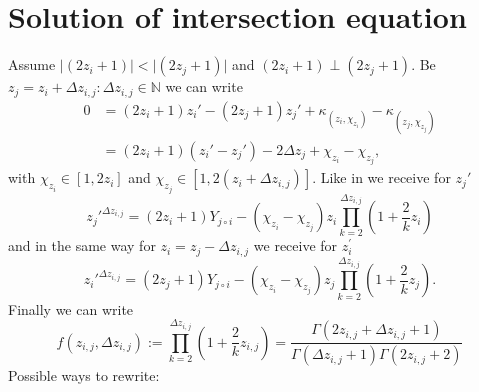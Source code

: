 \section{Solution of intersection equation}
\label{s:solutionofintersection}
Assume $\vert\left(2z_{i} + 1\right)\vert < \vert\left(2z_{j} + 1\right)\vert$ and $\left(2z_{i} + 1\right) \perp \left(2z_{j} + 1\right)$. Be $z_{j} = z_{i} + \Delta z_{i,j}:\Delta z_{i,j} \in \mathbb{N}$ we can write
\begin{equation}\begin{split}
	0 & = \left(2z_{i} + 1\right)z_{i}\prime - \left(2z_{j} + 1\right)z_{j}\prime + \kappa_{\left(z_{i}, \chi_{z_{i}}\right)} - \kappa_{\left(z_{j}, \chi_{z_{j}}\right)} \\
	& = \left(2z_{i} + 1\right)\left(z_{i}\prime - z_{j}\prime\right) - 2\Delta z_{j} + \chi_{z_{i}} - \chi_{z_{j}},
\end{split}\label{eq:intersectionDeltaz}\end{equation}
with $\chi_{z_{i}} \in [ 1, 2z_{i}]$ and $\chi_{z_{j}} \in [1, 2\left(z_{i} + \Delta z_{i,j}\right)]$. Like in \cite{2014arXiv1411.2824Z} we receive for $z_{j}\prime$
\begin{equation}
	z_{j}\prime^{\Delta z_{i,j}} = \left(2z_{i} + 1\right)Y_{j \circ i} - \left(\chi_{z_{i}} - \chi_{z_{j}}\right)z_{i}\prod_{k=2}^{\Delta z_{i,j}} \left(1 + \frac{2}{k}z_{i}\right)
\label{eq:zjsolution}\end{equation}
and in the same way for $z_{i} = z_{j} - \Delta z_{i,j}$ we receive for $z_{i}^{\prime}$
\begin{equation}
	z_{i}\prime^{\Delta z_{i,j}} = \left(2z_{j} + 1\right)Y_{j \circ i} - \left(\chi_{z_{i}} - \chi_{z_{j}}\right)z_{j}\prod_{k=2}^{\Delta z_{i,j}} \left(1 + \frac{2}{k}z_{j}\right).
\label{eq:zjsolution}\end{equation}
Finally we can write
\begin{equation}
	f\left(z_{i,j}, \Delta z_{i,j}\right) := \prod_{k=2}^{\Delta z_{i,j}} \left(1 + \frac{2}{k}z_{i,j}\right) = \frac{\Gamma\left(2z_{i,j} + \Delta z_{i,j} + 1\right)}{\Gamma\left(\Delta z_{i,j} + 1\right)\Gamma\left(2z_{i,j} + 2\right)}
\label{eq:gammafunczsol}\end{equation}
Possible ways to rewrite:
